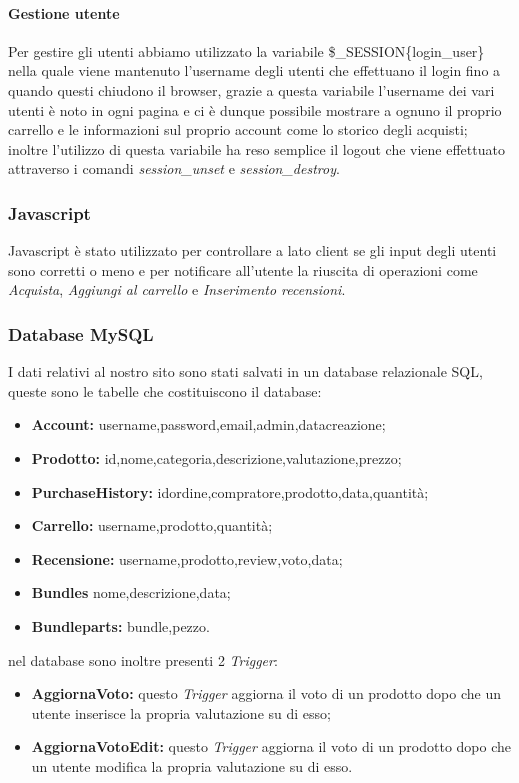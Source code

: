 \paragraph{Gestione utente} \Spazio
Per gestire gli utenti abbiamo utilizzato la variabile \$\_SESSION\{login\_user\} nella quale viene mantenuto l'username degli utenti che effettuano il login fino a quando questi chiudono il browser, grazie a questa variabile l'username dei vari utenti è noto in ogni pagina e ci è dunque possibile mostrare a ognuno il proprio carrello e le informazioni sul proprio account come lo storico degli acquisti;
inoltre l'utilizzo di questa variabile ha reso semplice il logout che viene effettuato attraverso i comandi \emph{session\_unset} e \emph{session\_destroy}.

\subsubsection{Javascript}
Javascript è stato utilizzato per controllare a lato client se gli input degli utenti sono corretti o meno e per notificare all'utente la riuscita di operazioni come 
\emph{Acquista}, \emph{Aggiungi al carrello} e \emph{Inserimento recensioni}.

\subsubsection{Database MySQL}
I dati relativi al nostro sito sono stati salvati in un database relazionale SQL, queste sono le tabelle che costituiscono il database:
\begin{itemize}
    \item \textbf{Account:} username,password,email,admin,datacreazione;
    \item \textbf{Prodotto:} id,nome,categoria,descrizione,valutazione,prezzo;
    \item \textbf{PurchaseHistory:} idordine,compratore,prodotto,data,quantità;
    \item \textbf{Carrello:} username,prodotto,quantità;
    \item \textbf{Recensione:} username,prodotto,review,voto,data;
    \item \textbf{Bundles} nome,descrizione,data;
    \item \textbf{Bundleparts:} bundle,pezzo.	
\end{itemize}
nel database sono inoltre presenti 2 \emph{Trigger}:
\begin{itemize}
	\item \textbf{AggiornaVoto:} questo \emph{Trigger} aggiorna il voto di un prodotto dopo che un utente inserisce la propria valutazione su di esso;
	\item \textbf{AggiornaVotoEdit:} questo \emph{Trigger} aggiorna il voto di un prodotto dopo che un utente modifica la propria valutazione su di esso.
\end{itemize}
